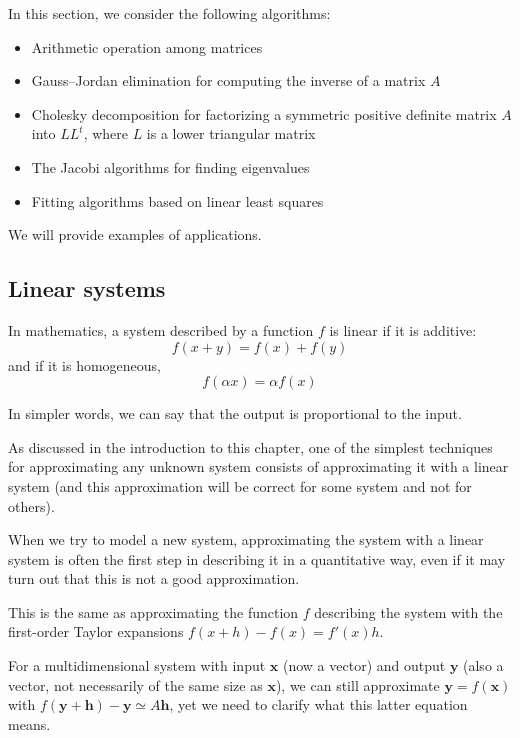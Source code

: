\documentclass[justified, sixbynine]{tufte-book}
\theoremstyle{plain}%
\newtheorem * {corollary}{Corollary}
\theoremstyle{definition}
\theoremstyle{remark}
\newtheorem * {remark}{Remark}
\newtheorem * {note}{Note}
\begin{document}
\begin{fullwidth}

In this section, we consider the following algorithms:
\begin{itemize}
\item Arithmetic operation among matrices
\item Gauss--Jordan elimination for computing the inverse of a matrix $A$
\item Cholesky decomposition for factorizing a symmetric positive definite matrix $A$ into $L L^t$, where $L$ is a lower triangular matrix
\item The Jacobi algorithms for finding eigenvalues
\item Fitting algorithms based on linear least squares
\end{itemize}
We will provide examples of applications.

\goodbreak\subsection{Linear systems}

In mathematics, a system described by a function $f$ is linear if it is additive:
\begin{equation}
f(x+y) = f(x) + f(y)
\end{equation}
and if it is homogeneous, 
\begin{equation}
f(\alpha x) = \alpha f(x)
\end{equation}

In simpler words, we can say that the output is proportional to the input.

As discussed in the introduction to this chapter, one of the simplest techniques for approximating any unknown system consists of approximating it with a linear system (and this approximation will be correct for some system and not for others).

When we try to model a new system, approximating the system with a linear system is often the first step in describing it in a quantitative way, even if it may turn out that this is not a good approximation.

This is the same as approximating the function $f$ describing the system with the first-order Taylor expansions $f(x+h) - f(x) = f'(x) h$.

For a multidimensional system with input $\mathbf{x}$ (now a vector) and output $\mathbf{y}$ (also a vector, not necessarily of the same size as $\mathbf{x}$), we can still approximate $\mathbf{y}=f(\mathbf{x})$ with
$f(\mathbf{y}+\mathbf{h}) - \mathbf{y} \simeq A \mathbf{h}$, yet we need to clarify what this latter equation means.


\end{fullwidth}
\end{document}
